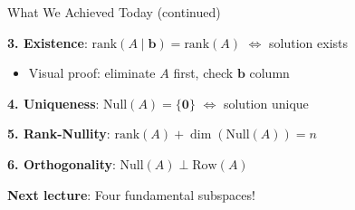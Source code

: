 \documentclass[10pt]{beamer}
\theoremstyle{definition}
\newcommand{\x}[1]{\alert{\textbf{#1}}}
\begin{document}
\begin{frame}{What We Achieved Today (continued)}

\x{3. Existence}: $\text{rank}(A \mid \mathbf{b}) = \text{rank}(A)$ $\iff$ solution exists

\begin{itemize}
\item Visual proof: eliminate $A$ first, check $\mathbf{b}$ column
\end{itemize}

\vspace{0.5em}

\x{4. Uniqueness}: $\text{Null}(A) = \{\mathbf{0}\}$ $\iff$ solution unique

\vspace{0.5em}

\x{5. Rank-Nullity}: $\text{rank}(A) + \dim(\text{Null}(A)) = n$

\vspace{0.5em}

\x{6. Orthogonality}: $\text{Null}(A) \perp \text{Row}(A)$

\vspace{1em}

\x{Next lecture}: Four fundamental subspaces!

\end{frame}
\end{document}
